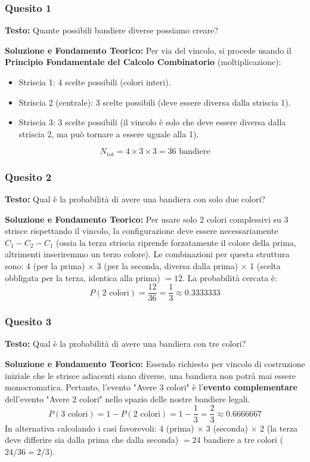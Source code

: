 \documentclass[12pt, a4paper]{article}
\begin{document}
\subsubsection*{Quesito 1}
\textbf{Testo:} Quante possibili bandiere diverse possiamo creare?

\textbf{Soluzione e Fondamento Teorico:} 
Per via del vincolo, si procede usando il \textbf{Principio Fondamentale del Calcolo Combinatorio} (moltiplicazione):
\begin{itemize}
    \item Striscia 1: 4 scelte possibili (colori interi).
    \item Striscia 2 (centrale): 3 scelte possibili (deve essere diversa dalla striscia 1).
    \item Striscia 3: 3 scelte possibili (il vincolo è solo che deve essere diversa dalla striscia 2, ma può tornare a essere uguale alla 1).
\end{itemize}
$$ N_{\text{tot}} = 4 \times 3 \times 3 = 36 \text{ bandiere} $$

\subsubsection*{Quesito 2}
\textbf{Testo:} Qual è la probabilità di avere una bandiera con solo due colori?

\textbf{Soluzione e Fondamento Teorico:} 
Per usare solo 2 colori complessivi su 3 strisce rispettando il vincolo, la configurazione deve essere necessariamente $C_1 - C_2 - C_1$ (ossia la terza striscia riprende forzatamente il colore della prima, altrimenti inseriremmo un terzo colore).
Le combinazioni per questa struttura sono: 4 (per la prima) $\times$ 3 (per la seconda, diversa dalla prima) $\times$ 1 (scelta obbligata per la terza, identica alla prima) $= 12$.
La probabilità cercata è:
$$ P(2 \text{ colori}) = \frac{12}{36} = \frac{1}{3} \approx 0.3333333 $$

\subsubsection*{Quesito 3}
\textbf{Testo:} Qual è la probabilità di avere una bandiera con tre colori?

\textbf{Soluzione e Fondamento Teorico:} 
Essendo richiesto per vincolo di costruzione iniziale che le strisce adiacenti siano diverse, una bandiera non potrà mai essere monocromatica. Pertanto, l'evento "Avere 3 colori" è l'\textbf{evento complementare} dell'evento "Avere 2 colori" nello spazio delle nostre bandiere legali.
$$ P(3 \text{ colori}) = 1 - P(2 \text{ colori}) = 1 - \frac{1}{3} = \frac{2}{3} \approx 0.6666667 $$
In alternativa calcolando i casi favorevoli: 4 (prima) $\times$ 3 (seconda) $\times$ 2 (la terza deve differire sia dalla prima che dalla seconda) $= 24$ bandiere a tre colori ($24/36 = 2/3$).
\end{document}
